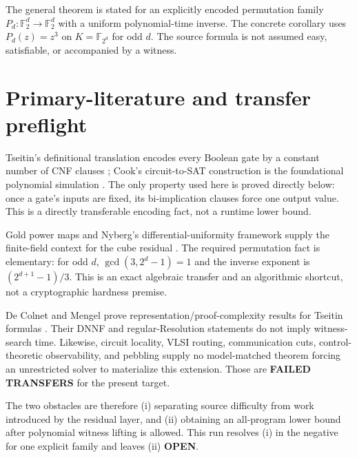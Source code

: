 \documentclass[11pt]{article}
\newcommand{\F}{\mathbb F_2}
\newcommand{\OPEN}{\textbf{OPEN}}
\begin{document}
The general theorem is stated for an explicitly encoded permutation family
$P_d:\F^d\to\F^d$ with a uniform polynomial-time inverse.  The concrete
corollary uses $P_d(z)=z^3$ on $K=\mathbb F_{2^d}$ for odd $d$.  The source
formula is not assumed easy, satisfiable, or accompanied by a witness.

\section{Primary-literature and transfer preflight}
Tseitin's definitional translation encodes every Boolean gate by a constant
number of CNF clauses \cite{Tseitin}; Cook's circuit-to-SAT construction is
the foundational polynomial simulation \cite{Cook}.  The only property used
here is proved directly below: once a gate's inputs are fixed, its
bi-implication clauses force one output value.  This is a directly
transferable encoding fact, not a runtime lower bound.

Gold power maps and Nyberg's differential-uniformity framework supply the
finite-field context for the cube residual \cite{Gold,Nyberg}.  The required
permutation fact is elementary: for odd $d$,
$\gcd(3,2^d-1)=1$ and the inverse exponent is
$(2^{d+1}-1)/3$.  This is an exact algebraic transfer and an algorithmic
shortcut, not a cryptographic hardness premise.

De Colnet and Mengel prove representation/proof-complexity results for
Tseitin formulas \cite{dCM}.  Their DNNF and regular-Resolution statements do
not imply witness-search time.  Likewise, circuit locality, VLSI routing,
communication cuts, control-theoretic observability, and pebbling supply no
model-matched theorem forcing an unrestricted solver to materialize this
extension.  Those are \textbf{FAILED TRANSFERS} for the present target.

The two obstacles are therefore (i) separating source difficulty from work
introduced by the residual layer, and (ii) obtaining an all-program lower
bound after polynomial witness lifting is allowed.  This run resolves (i) in
the negative for one explicit family and leaves (ii) \OPEN{}.
\end{document}
